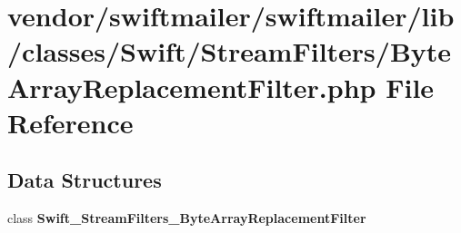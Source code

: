 \section{vendor/swiftmailer/swiftmailer/lib/classes/\+Swift/\+Stream\+Filters/\+Byte\+Array\+Replacement\+Filter.php File Reference}
\label{_byte_array_replacement_filter_8php}
\subsection*{Data Structures}
\begin{DoxyCompactItemize}
\item 
class {\bf Swift\+\_\+\+Stream\+Filters\+\_\+\+Byte\+Array\+Replacement\+Filter}
\end{DoxyCompactItemize}
